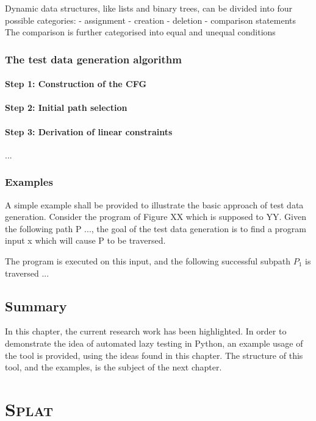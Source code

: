 \documentclass{icldt}
\numberwithin{equation}{section}       %
\begin{document}
{	Dynamic data structures, like lists and binary trees, can be divided into four possible categories\cite{Zhao2007}:
		- assignment
		- creation
		- deletion
		- comparison statements
			The comparison is further categorised into equal and unequal conditions
	\cite {}

\subsection{The test data generation algorithm}

	\subsubsection{Step 1: Construction of the CFG}
	\subsubsection{Step 2: Initial path selection}
	\subsubsection{Step 3: Derivation of linear constraints}
	...

\subsection{Examples}
A simple example shall be provided to illustrate the basic approach of test data generation. Consider the program of Figure XX which is supposed to YY.
Given the following path P ..., the goal of the test data generation is to find a program input x which will cause P to be traversed.

The program is executed on this input, and the following successful subpath $P_1$ is traversed ...

\section{Summary}
In this chapter, the current research work has been highlighted. In order to demonstrate the idea of automated lazy testing in Python, an example usage of the tool is provided, using the ideas found in this chapter. The structure of this tool, and the examples, is the subject of the next chapter.
\chapter{\textsc{Splat}}
\label{ch:splat}

}
\end{document}
